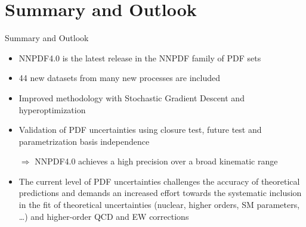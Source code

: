 \documentclass[aspectratio=169,9pt]{beamer}
\begin{document}
\section{Summary and Outlook}
\begin{frame}[t]{Summary and Outlook}
    \begin{itemize}
        \item NNPDF4.0 is the latest release in the NNPDF family of PDF sets
        \item 44 new datasets from many new processes are included
        \item Improved methodology with Stochastic Gradient Descent and hyperoptimization
        \item Validation of PDF uncertainties using closure test, future test and parametrization basis independence
        \item[$\Rightarrow$] NNPDF4.0 achieves a high precision over a broad kinematic range
    \end{itemize}
	\vspace*{1em}
    \begin{itemize}
        \item The current level of PDF uncertainties challenges the accuracy of theoretical predictions and demands an increased effort towards the systematic inclusion in the fit of theoretical uncertainties (nuclear, higher orders, SM parameters, \ldots ) and higher-order QCD and EW corrections
    \end{itemize}


    \vspace*{1em}
\end{frame}




\end{document}
